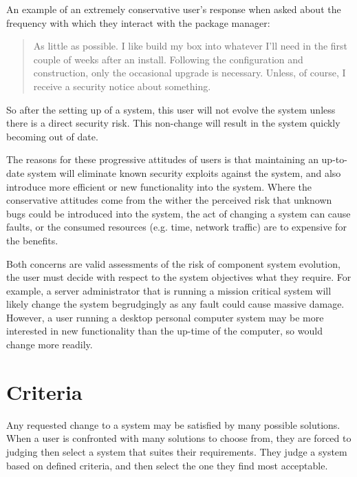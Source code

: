 An example of an extremely conservative user's response when asked about the frequency with which they interact with the package manager:
\begin{quotation}
As little as possible. I like build my box into whatever I'll need in the first couple of weeks after an install. 
Following the configuration and construction, only the occasional upgrade is necessary. 
Unless, of course, I receive a security notice about something.
\end{quotation}
So after the setting up of a system, this user will not evolve the system unless there is a direct security risk.
This non-change will result in the system quickly becoming out of date.

The reasons for these progressive attitudes of users is that maintaining an up-to-date system will eliminate known security exploits against the system,
and also introduce more efficient or new functionality into the system.
Where the conservative attitudes come from the wither the perceived risk that unknown bugs could be introduced into the system, the act of changing a system can cause faults,
or the consumed resources (e.g. time, network traffic) are to expensive for the benefits.

Both concerns are valid assessments of the risk of component system evolution, the user must decide with respect to the system objectives what they require. 
For example, a server administrator that is running a mission critical system will likely change the system begrudgingly as any fault could cause massive damage.
However, a user running a desktop personal computer system may be more interested in new functionality than the up-time of the computer, so would change more readily.

\section{Criteria}
Any requested change to a system may be satisfied by many possible solutions.
When a user is confronted with many solutions to choose from, they are forced to judging then select a system that suites their requirements.
They judge a system based on defined criteria, and then select the one they find most acceptable.

